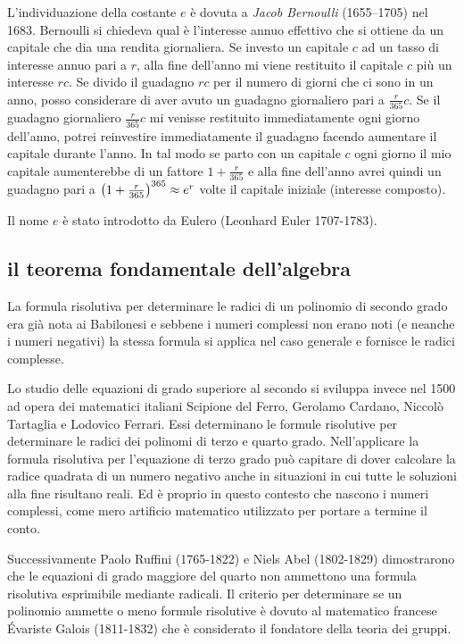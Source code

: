 \label{note:Bernoulli}%
%
L'individuazione della costante $e$
è dovuta a \emph{Jacob Bernoulli} (1655--1705) nel 1683.
Bernoulli si chiedeva qual è l'interesse annuo effettivo
che si ottiene da un capitale che dia una rendita
giornaliera.
Se investo un capitale $c$ ad un tasso di interesse annuo 
pari a $r$, alla fine dell'anno mi viene restituito 
il capitale $c$ più un interesse $rc$.
Se divido il guadagno $rc$ per il numero di giorni che ci sono in 
un anno, posso considerare di aver avuto un guadagno giornaliero
pari a $\frac{r}{365} c$.
Se il guadagno giornaliero $\frac{r}{365} c$ mi venisse restituito 
immediatamente ogni giorno dell'anno, potrei reinvestire immediatamente 
il guadagno facendo aumentare il capitale durante l'anno.
In tal modo se parto con un capitale $c$ ogni giorno il mio capitale 
aumenterebbe di un fattore $1+\frac{r}{365}$ e
alla fine dell'anno avrei quindi un guadagno
pari a ${\left( 1+\frac{r}{365} \right)}^{365} \approx e^r$ 
volte il capitale iniziale (interesse composto).

Il nome $e$ è stato introdotto da Eulero (Leonhard Euler 1707-1783).

\subsection{il teorema fondamentale dell'algebra}

La formula risolutiva per determinare le radici di un polinomio di secondo grado 
era già nota ai Babilonesi e sebbene i numeri complessi non erano noti 
(e neanche i numeri negativi) la stessa formula si applica 
nel caso generale e fornisce le radici complesse.

Lo studio delle equazioni di grado superiore al secondo si sviluppa invece 
nel 1500 ad opera dei matematici italiani Scipione del Ferro, 
Gerolamo Cardano, Niccolò Tartaglia e Lodovico Ferrari.
Essi determinano le formule risolutive per determinare le radici 
dei polinomi di terzo e quarto grado. 
Nell'applicare la formula risolutiva per l'equazione di terzo grado 
può capitare di dover calcolare la radice quadrata di un numero negativo
anche in situazioni in cui tutte le soluzioni alla fine risultano reali.
Ed è proprio in questo contesto che nascono i numeri complessi, come 
mero artificio matematico utilizzato per portare a termine il conto.

Successivamente Paolo Ruffini (1765-1822) e Niels Abel (1802-1829) dimostrarono che le equazioni 
di grado maggiore del quarto non ammettono una formula risolutiva 
esprimibile mediante radicali. 
Il criterio per determinare se un polinomio
ammette o meno formule risolutive è dovuto al matematico francese Évariste Galois
(1811-1832) che è considerato il fondatore della teoria dei gruppi.

